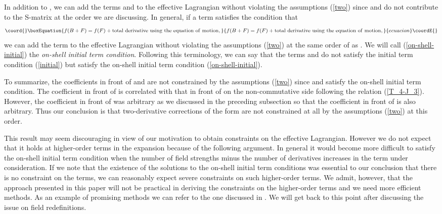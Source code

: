\documentclass[a4paper,12pt]{article}
\begin{document}
In addition to \coordHE{}, we can add the terms \coordHE{} and \coordHE{}
to the effective Lagrangian
without violating the assumptions (\ref{two})
since \coordHE{} and \coordHE{} do not contribute to the S-matrix
at the order we are discussing.
In general, if a term \coordHE{} satisfies the condition that
\begin{equation}\coord{}\boxEquation{
f(B+F) = f(F) + {\rm total~derivative~using~the~equation~of~motion},
\label{on-shell-initial}
}{
f(B+F) = f(F) + {\rm total~derivative~using~the~equation~of~motion},
}{ecuacion}\coordE{}\end{equation}
we can add the term to the effective Lagrangian
without violating the assumptions (\ref{two}) at the same order
of \coordHE{} as \coordHE{}.
We will call (\ref{on-shell-initial})
the {\it on-shell initial term condition}.
Following this terminology, we can say that
the terms \coordHE{} and \coordHE{} do not satisfy the initial term condition
(\ref{initial}) but satisfy the on-shell initial term condition
(\ref{on-shell-initial}).

To summarize, the coefficients in front of \coordHE{} and \coordHE{}
are not constrained by the assumptions (\ref{two})
since \coordHE{} and \coordHE{} satisfy the on-shell initial term condition.
The coefficient in front of \coordHE{} is correlated with that in front of
\coordHE{} on the non-commutative side
following the relation (\ref{T_4-J_3}).
However, the coefficient in front of \coordHE{} was arbitrary
as we discussed in the preceding subsection so that
the coefficient in front of \coordHE{} is also arbitrary.
Thus our conclusion is that two-derivative corrections of the form
\coordHE{} are not constrained at all
by the assumptions (\ref{two}) at this order.

This result may seem discouraging in view of our motivation
to obtain constraints on the effective Lagrangian.
However we do not expect that it holds at higher-order terms
in the \coordHE{} expansion because of the following argument.
In general it would become more difficult
to satisfy the on-shell initial term condition
when the number of field strengths minus
the number of derivatives increases
in the term under consideration.
If we note that the existence of the solutions
to the on-shell initial term conditions was
essential to our conclusion that there is no constraint
on the \coordHE{} terms,
we can reasonably expect severe constraints
on such higher-order terms.
We admit, however, that the approach presented in this paper
will not be practical in deriving the constraints
on the higher-order terms
and we need more efficient methods.
As an example of promising methods
we can refer to the one discussed in \cite{Terashima}.
We will get back to this point after discussing the issue
on field redefinitions.
\end{document}

